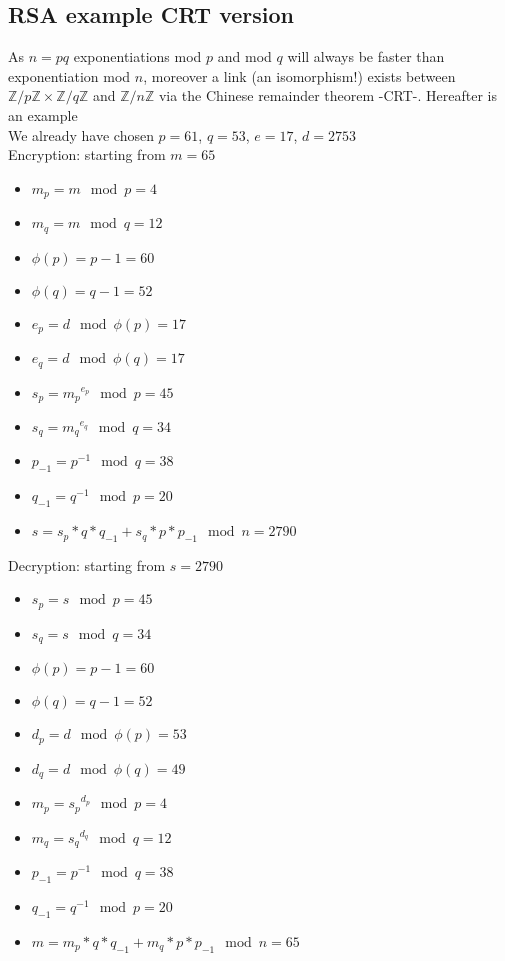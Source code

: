 \subsection*{RSA example CRT version}
 	As $n=pq$ exponentiations mod $p$ and mod $q$ will always be faster than exponentiation mod $n$,
 	moreover a link (an isomorphism!) exists between  $\mathbb{Z}/{p \mathbb{Z}} \times  \mathbb{Z}/{q \mathbb{Z}}$ and  $\mathbb{Z}/{n \mathbb{Z}}$
 	via the Chinese remainder theorem -CRT-. Hereafter is an example\\
 	We already have chosen $p=61$, $q=53$, $e=17$, $d=2753$\\
Encryption: starting from $m=65$ \vspace{-5mm}
	\begin{itemize}
		\item $m_p= m \mod p=4$
		\item $m_q= m \mod q=12$
		\item $\phi(p)=p-1=60$
		\item $\phi(q)=q-1=52$
		\item $e_p= d \mod \phi(p)=17$
		\item $e_q= d \mod \phi(q)=17$
		\item $s_p={m_p}^{e_p} \mod p=45$
		\item $s_q={m_q}^{e_q} \mod q=34$
		\item $p_{-1}= p^{-1} \mod q=38$
		\item $q_{-1}= q^{-1} \mod p=20$
		\item $s=s_p*q*q_{-1} + s_q*p*p_{-1} \mod n=2790$
	\end{itemize}
Decryption: starting from $s=2790$ \vspace{-5mm}
	\begin{itemize}
		\item $s_p= s \mod p=45$
		\item $s_q= s \mod q=34$
		\item $\phi(p)=p-1=60$
		\item $\phi(q)=q-1=52$
		\item $d_p= d \mod \phi(p)=53$
		\item $d_q= d \mod \phi(q)=49$
		\item $m_p={s_p}^{d_p} \mod p=4$
		\item $m_q={s_q}^{d_q} \mod q=12$
		\item $p_{-1}= p^{-1} \mod q=38$
		\item $q_{-1}= q^{-1} \mod p=20$
		\item $m=m_p*q*q_{-1} + m_q*p*p_{-1} \mod n=65$
	\end{itemize}

